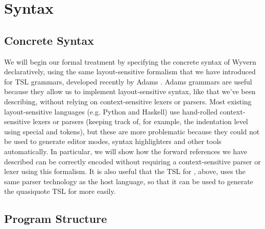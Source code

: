 \section{Syntax}
\label{s:approach}

\subsection{Concrete Syntax}

We will begin our formal treatment by specifying the concrete syntax of Wyvern declaratively, using the same layout-sensitive formalism that we have introduced for TSL grammars, developed recently by Adams \cite{Adams:2013:PPI:2429069.2429129}. Adams grammars are useful because they allow us to implement  layout-sensitive syntax, like that we've been describing, without relying on context-sensitive lexers or parsers. Most existing layout-sensitive languages (e.g. Python and Haskell) use hand-rolled context-sensitive lexers or parsers (keeping track of, for example, the indentation level using special  and  tokens), but these are more problematic because they could not be used to generate editor modes, syntax highlighters and other tools automatically. In particular, we will show how the forward references we have described can be correctly encoded without requiring a context-sensitive parser or lexer using this formalism. It is also useful that the TSL for , above, uses the same parser technology as the host language, so that it can be used to generate the quasiquote TSL for  more easily.

\subsection{Program Structure}

